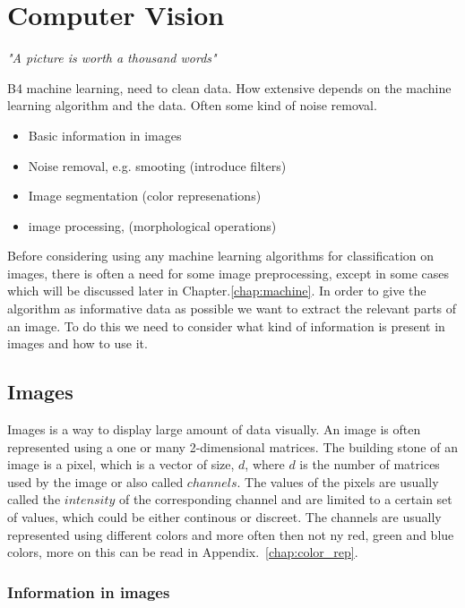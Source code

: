 \chapter{Computer Vision}
\begin{center}
\vspace{-6ex}
\textit{"A picture is worth a thousand words"}
\vspace{6ex}
\end{center}

B4 machine learning, need to clean data. How extensive depends on the machine learning algorithm and the data. Often some kind of noise removal.

\begin{itemize}
    \item Basic information in images
    \item Noise removal, e.g. smooting (introduce filters)
    \item Image segmentation (color represenations)
    \item image processing, (morphological operations)
\end{itemize}


Before considering using any machine learning algorithms for classification on images, there is often a need for some image preprocessing, except in some cases which will be discussed later in Chapter.\ref{chap:machine}. In order to give the algorithm as informative data as possible we want to extract the relevant parts of an image. To do this we need to consider what kind of information is present in images and how to use it.

\section{Images}

Images is a way to display large amount of data visually. An image is often represented using a one or many 2-dimensional matrices. The building stone of an image is a pixel, which is a vector of size, $d$, where $d$ is the number of matrices used by the image or also called $channels$. The values of the pixels are usually called the $intensity$ of the corresponding channel and are limited to a certain set of values, which could be either continous or discreet. The channels are usually represented using different colors and more often then not ny red, green and blue colors, more on this can be read in Appendix.~\ref{chap:color_rep}.

\subsection{Information in images}

